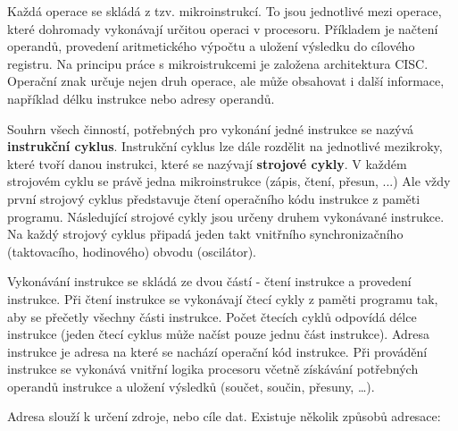Každá operace se skládá z tzv. mikroinstrukcí. To jsou jednotlivé mezi operace, které dohromady vykonávají určitou operaci v procesoru. Příkladem je načtení operandů, provedení aritmetického výpočtu a uložení výsledku do cílového registru. Na principu práce s mikroistrukcemi je založena architektura CISC. Operační znak určuje nejen druh operace, ale může obsahovat i další informace, například délku instrukce nebo adresy operandů.

Souhrn všech činností, potřebných pro vykonání jedné instrukce se nazývá {\bf instrukční cyklus}. Instrukční cyklus lze dále rozdělit na jednotlivé mezikroky, které tvoří danou instrukci, které se nazývají {\bf strojové cykly}. V každém strojovém cyklu se právě jedna mikroinstrukce (zápis, čtení, přesun, ...) Ale vždy první strojový cyklus představuje čtení operačního kódu instrukce z paměti programu. Následující strojové cykly jsou určeny druhem vykonávané instrukce. Na každý strojový cyklus připadá jeden takt vnitřního synchronizačního (taktovacího, hodinového) obvodu (oscilátor).

Vykonávání instrukce se skládá ze dvou částí - čtení instrukce a provedení instrukce. Při čtení instrukce se vykonávají čtecí cykly z paměti programu tak, aby se přečetly všechny části instrukce. Počet čtecích cyklů odpovídá délce instrukce (jeden čtecí cyklus může načíst pouze jednu část instrukce). Adresa instrukce je adresa na které se nachází operační kód instrukce. Při provádění instrukce se vykonává vnitřní logika procesoru včetně získávání potřebných operandů instrukce a uložení výsledků (součet, součin, přesuny, …). 









Adresa slouží k určení zdroje, nebo cíle dat. Existuje několik způsobů adresace:

